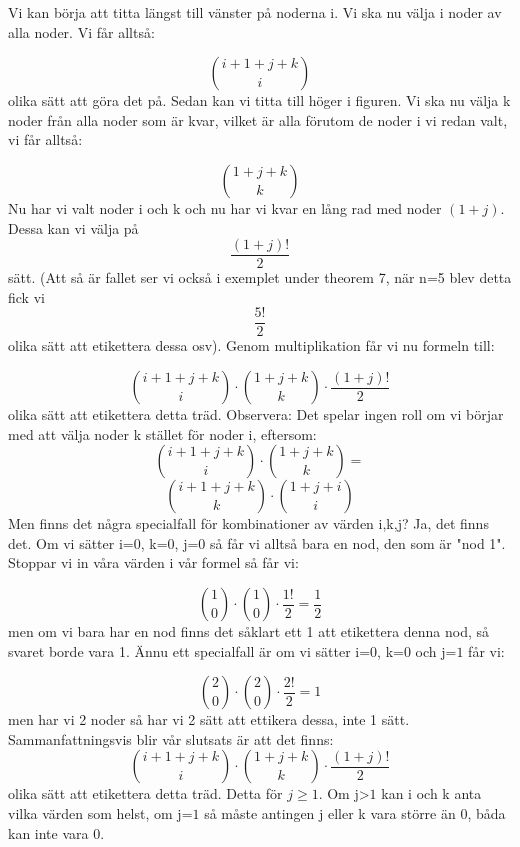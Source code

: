 \documentclass[nobib]{tufte-handout}
\begin{document}
    
\begin{solution}
    
    
Vi kan börja att titta längst till vänster på noderna i. Vi ska nu välja i noder av alla noder. Vi får alltså: 

$${\binom{i+1+j+k}{i}}$$ olika sätt att göra det på. Sedan kan vi titta till höger i figuren. Vi ska nu välja k noder från alla noder som är kvar, vilket är alla förutom de noder i vi redan valt, vi får alltså:

$${\binom{1+j+k}{k}}$$ Nu har vi valt noder i och k och nu har vi kvar en lång rad med noder $(1+j)$. 
Dessa kan vi välja på $$\frac{(1+j)!}{2}$$ sätt. (Att så är fallet ser vi också i exemplet under theorem 7, när n=5 blev detta fick vi $$\frac{5!}{2}$$ olika sätt att etikettera dessa osv). Genom multiplikation får vi nu formeln till:

$${\binom{i+1+j+k}{i}}\cdot{\binom{1+j+k}{k}}\cdot\frac{(1+j)!}{2}$$ olika sätt att etikettera detta träd. Observera: Det spelar ingen roll om vi börjar med att välja noder k stället för noder i, eftersom:
$${\binom{i+1+j+k}{i}}\cdot{\binom{1+j+k}{k}} = $$ 
$${\binom{i+1+j+k}{k}}\cdot{\binom{1+j+i}{i}}$$ Men finns det några specialfall för kombinationer av värden i,k,j? Ja, det finns det. Om vi sätter i=$0$, k=$0$, j=$0$ så får vi alltså bara en nod, den som är "nod 1". Stoppar vi in våra värden i vår formel så får vi:

$${\binom{1}{0}}\cdot{\binom{1}{0}}\cdot\frac{1!}{2} = \frac{1}{2} $$ men om vi bara har en nod finns det såklart ett 1 att etikettera denna nod, så svaret borde vara 1. Ännu ett specialfall är om vi sätter i=$0$, k=$0$ och j=$1$ får vi: 

$${\binom{2}{0}}\cdot{\binom{2}{0}}\cdot\frac{2!}{2} = 1 $$ men har vi 2 noder så har vi 2 sätt att ettikera dessa, inte 1 sätt. Sammanfattningsvis blir vår slutsats är att det finns:
$${\binom{i+1+j+k}{i}}\cdot{\binom{1+j+k}{k}}\cdot\frac{(1+j)!}{2}$$ olika sätt att etikettera detta träd. Detta för $j\ge 1$. Om j>$1$ kan i och k anta vilka värden som helst, om j=$1$ så måste antingen j eller k vara större än $0$, båda kan inte vara $0$.








        
\end{solution}
\end{document}
